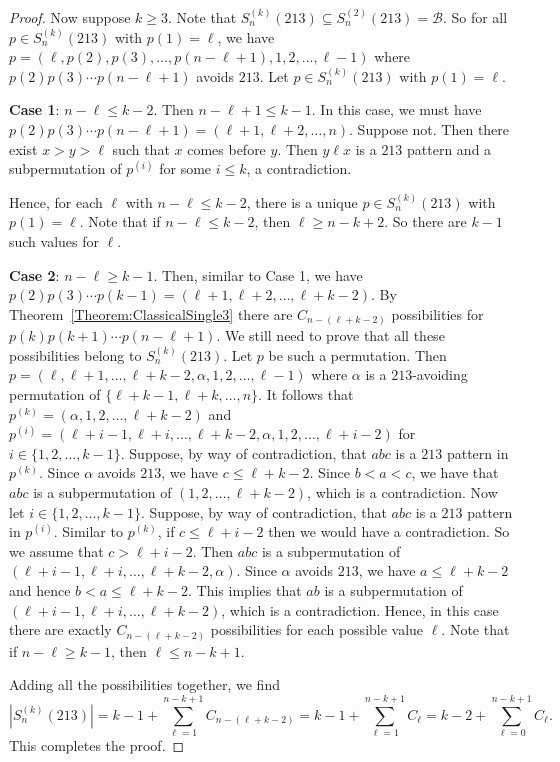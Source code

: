 \documentclass[11pt]{article}
\theoremstyle{definition}
\numberwithin{equation}{section}
\begin{document}
\begin{proof}
Now suppose $k\geq3$. Note that $S_n^{(k)}(213)\subseteq S_n^{(2)}(213)=\mathcal{B}$. So for all $p\in S_n^{(k)}(213)$ with $p(1)=\ell$, we have $p=(\ell,p(2),p(3),\ldots,p(n-\ell+1),1,2,\ldots,\ell-1)$ 
where $p(2)p(3)\cdots p(n-\ell+1)$ avoids $213$. Let $p\in S_n^{(k)}(213)$ with $p(1)=\ell$.

\textbf{Case 1}: $n-\ell\leq k-2$. Then $n-\ell+1\leq k-1$. In this case, we must have $p(2)p(3)\cdots p(n-\ell+1)=(\ell+1,\ell+2,\ldots,n)$. 
Suppose not. Then there exist $x>y>\ell$ such that $x$ comes before $y$. 
Then $y\ell x$ is a $213$ pattern and a subpermutation of $p^{(i)}$ for some $i\leq k$,  a contradiction.

Hence, for each $\ell$ with $n-\ell\leq k-2$, there is a unique $p\in S_n^{(k)}(213)$ with $p(1)=\ell$. Note that if $n-\ell\leq k-2$, then $\ell\geq n-k+2$. So there are $k-1$ such values for $\ell$.

\textbf{Case 2}: $n-\ell\geq k-1$. 
Then, similar to Case 1, we have $p(2)p(3)\cdots p(k-1)=(\ell+1,\ell+2,\ldots,\ell+k-2)$. 
By Theorem~\ref{Theorem:ClassicalSingle3} there are $C_{n-(\ell+k-2)}$ possibilities for $p(k)p(k+1)\cdots p(n-\ell+1)$. We still need to prove that all these possibilities belong to $S^{(k)}_n(213)$. Let $p$ be such a permutation. Then $p=(\ell,\ell+1,\ldots,\ell+k-2,\alpha,1,2,\ldots,\ell-1)$ where $\alpha$ is a $213$-avoiding permutation of $\{\ell+k-1,\ell+k,\ldots,n\}$. It follows that $p^{(k)}=(\alpha,1,2,\ldots,\ell+k-2)$ and $p^{(i)}=(\ell+i-1,\ell+i,\ldots,\ell+k-2,\alpha,1,2,\ldots,\ell+i-2)$ for $i\in\{1,2,\ldots,k-1\}$. 
Suppose, by way of contradiction, that $abc$ is a $213$ pattern in $p^{(k)}$. Since $\alpha$ avoids $213$, we have $c\leq\ell+k-2$. Since $b<a<c$, we have that $abc$ is a subpermutation of $(1,2,\ldots,\ell+k-2)$, which is a contradiction. Now let $i\in\{1,2,\ldots,k-1\}$. 
Suppose, by way of contradiction, that $abc$ is a $213$ pattern in $p^{(i)}$. Similar to $p^{(k)}$, if $c\leq \ell+i-2$ then we would have a contradiction. So we assume that $c>\ell+i-2$.
Then $abc$ is a subpermutation of $(\ell+i-1,\ell+i,\ldots,\ell+k-2,\alpha)$. Since $\alpha$ avoids $213$, we have $a\leq\ell+k-2$ and hence $b<a\leq \ell+k-2$. This implies that $ab$ is a subpermutation of $(\ell+i-1,\ell+i,\ldots,\ell+k-2)$, which is a contradiction. Hence, in this case there are exactly $C_{n-(\ell+k-2)}$ possibilities for each possible value $\ell$. 
Note that if $n-\ell\geq k-1$, then $\ell\leq n-k+1$.

Adding all the possibilities together, we find
\[
|S_n^{(k)}(213)|=k-1+\sum_{\ell=1}^{n-k+1}C_{n-(\ell+k-2)}=k-1+\sum_{\ell=1}^{n-k+1}C_\ell=k-2+\sum_{\ell=0}^{n-k+1}C_\ell.
\]
This completes the proof.
\end{proof}
\end{document}
